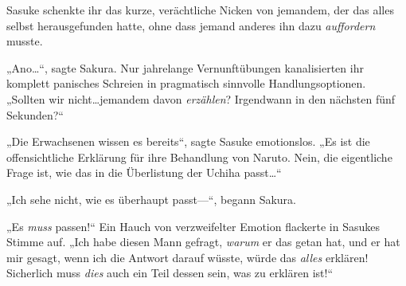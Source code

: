 Sasuke schenkte ihr das kurze, verächtliche Nicken von jemandem, der das alles selbst herausgefunden hatte, ohne dass jemand anderes ihn dazu \emph{auffordern} musste.

„Ano…“, sagte Sakura. Nur jahrelange Vernunftübungen kanalisierten ihr komplett panisches Schreien in pragmatisch sinnvolle Handlungsoptionen.
„Sollten wir nicht…jemandem davon \emph{erzählen}? Irgendwann in den nächsten fünf Sekunden?“

„Die Erwachsenen wissen es bereits“, sagte Sasuke emotionslos.
„Es ist die offensichtliche Erklärung für ihre Behandlung von Naruto. Nein, die eigentliche Frage ist, wie das in die Überlistung der Uchiha passt…“

„Ich sehe nicht, wie es überhaupt passt—“, begann Sakura.

„Es \emph{muss} passen!“ Ein Hauch von verzweifelter Emotion flackerte in Sasukes Stimme auf.
„Ich habe diesen Mann gefragt, \emph{warum} er das getan hat, und er hat mir gesagt, wenn ich die Antwort darauf wüsste, würde das \emph{alles} erklären! Sicherlich muss \emph{dies} auch ein Teil dessen sein, was zu erklären ist!“

